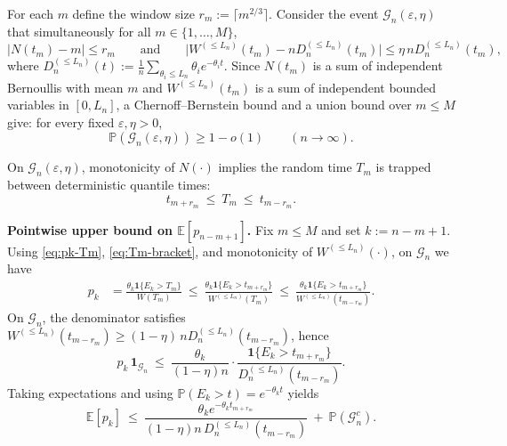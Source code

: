 \documentclass[10pt]{article}
\numberwithin{equation}{section}
\begin{document}
For each $m$ define the window size $r_m:=\lceil m^{2/3}\rceil$.
Consider the event $\mathcal G_n(\varepsilon,\eta)$ that simultaneously for all $m\in\{1,\dots,M\}$,
\begin{equation}\label{eq:G-event}
\big|N(t_m)-m\big|\le r_m
\qquad\text{and}\qquad
\big|W^{(\le L_n)}(t_m)-nD_n^{(\le L_n)}(t_m)\big|\le \eta\,nD_n^{(\le L_n)}(t_m),
\end{equation}
where $D_n^{(\le L_n)}(t):=\frac1n\sum_{\theta_i\le L_n}\theta_i e^{-\theta_i t}$.
Since $N(t_m)$ is a sum of independent Bernoullis with mean $m$ and $W^{(\le L_n)}(t_m)$ is a sum of independent
bounded variables in $[0,L_n]$, a Chernoff--Bernstein bound and a union bound over $m\le M$ give:
for every fixed $\varepsilon,\eta>0$,
\begin{equation}\label{eq:G-prob}
\mathbb P(\mathcal G_n(\varepsilon,\eta))\ge 1-o(1)\qquad(n\to\infty).
\end{equation}

On $\mathcal G_n(\varepsilon,\eta)$, monotonicity of $N(\cdot)$ implies the random time $T_m$ is trapped between
deterministic quantile times:
\begin{equation}\label{eq:Tm-bracket}
t_{m+r_m}\ \le\ T_m\ \le\ t_{m-r_m}.
\end{equation}

\textbf{Pointwise upper bound on $\mathbb E[p_{n-m+1}]$.}
Fix $m\le M$ and set $k:=n-m+1$.
Using \eqref{eq:pk-Tm}, \eqref{eq:Tm-bracket}, and monotonicity of $W^{(\le L_n)}(\cdot)$, on $\mathcal G_n$ we have
\begin{align}
p_k
&=\frac{\theta_k\mathbf 1\{E_k>T_m\}}{W(T_m)}
\ \le\ \frac{\theta_k\mathbf 1\{E_k>t_{m+r_m}\}}{W^{(\le L_n)}(T_m)}
\ \le\ \frac{\theta_k\mathbf 1\{E_k>t_{m+r_m}\}}{W^{(\le L_n)}(t_{m-r_m})}. \label{eq:pk-basic-bound}
\end{align}
On $\mathcal G_n$, the denominator satisfies
$W^{(\le L_n)}(t_{m-r_m})\ge (1-\eta)\,nD_n^{(\le L_n)}(t_{m-r_m})$, hence
\begin{equation}\label{eq:pk-good}
p_k\,\mathbf 1_{\mathcal G_n}
\ \le\ \frac{\theta_k}{(1-\eta)n}\cdot \frac{\mathbf 1\{E_k>t_{m+r_m}\}}{D_n^{(\le L_n)}(t_{m-r_m})}.
\end{equation}
Taking expectations and using $\mathbb P(E_k>t)=e^{-\theta_k t}$ yields
\begin{equation}\label{eq:Ekpk-preasymp}
\mathbb E[p_k]
\ \le\ \frac{\theta_k e^{-\theta_k t_{m+r_m}}}{(1-\eta)n\,D_n^{(\le L_n)}(t_{m-r_m})}
\ +\ \mathbb P(\mathcal G_n^c).
\end{equation}
\end{document}
